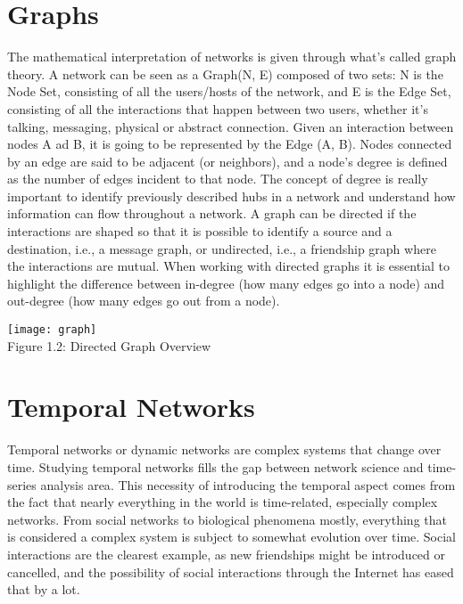 \section{Graphs}
\label{sec:graphs}
The mathematical interpretation of networks is given through what's called graph theory. A network can be seen as a Graph(N, E) composed of two sets: N is the Node Set, consisting of all the users/hosts of the network, and E is the Edge Set, consisting of all the interactions that happen between two users, whether it's talking, messaging, physical or abstract connection. Given an interaction between nodes A ad B, it is going to be represented by the Edge (A, B). Nodes connected by an edge are said to be adjacent (or neighbors), and a node's degree is defined as the number of edges incident to that node. The concept of degree is really important to identify previously described hubs in a network and understand how information can flow throughout a network. A graph can be directed if the interactions are shaped so that it is possible to identify a source and a destination, i.e., a message graph, or undirected, i.e., a friendship graph where the interactions are mutual. When working with directed graphs it is essential to highlight the difference between in-degree (how many edges go into a node) and out-degree (how many edges go out from a node).

\begin{center}
    \texttt{[image: graph]}
    \\
        Figure 1.2: Directed Graph Overview
\end{center}

\section{Temporal Networks}
Temporal networks or dynamic networks are complex systems that change over time. Studying temporal networks fills the gap between network science and time-series analysis area\cite{HOLME201297}. 
This necessity of introducing the temporal aspect comes from the fact that nearly everything in the world is time-related, especially complex networks. From social networks to biological phenomena mostly, everything that is considered a complex system is subject to somewhat evolution over time\cite{PMID:35538294}. 
Social interactions are the clearest example, as new friendships might be introduced or cancelled, and the possibility of social interactions through the Internet has eased that by a lot.

